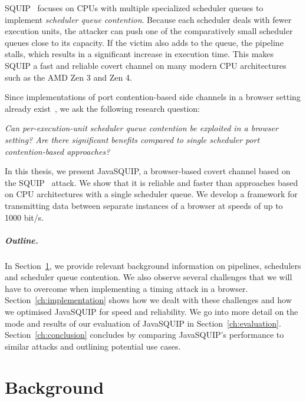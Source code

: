 \documentclass[11pt,
  titlepage=false,
]{scrreprt}
\begin{document}
SQUIP~\cite{squip} focuses on CPUs with multiple specialized scheduler queues to implement \textit{scheduler queue contention}.
Because each scheduler deals with fewer execution units, the attacker can push one of the comparatively small scheduler queues close to its capacity.
If the victim also adds to the queue, the pipeline stalls, which results in a significant increase in execution time.
This makes SQUIP a fast and reliable covert channel on many modern CPU architectures such as the AMD Zen 3 and Zen 4.~\cite{squip}

Since implementations of port contention-based side channels in a browser setting already exist~\cite{Rokicki2022webport}, we ask the following research question:

\textit{
    Can per-execution-unit scheduler queue contention be exploited in a browser setting?
    Are there significant benefits compared to single scheduler port contention-based approaches?
}

In this thesis, we present JavaSQUIP, a browser-based covert channel based on the SQUIP~\cite{squip} attack.
We show that it is reliable and faster than approaches based on CPU architectures with a single scheduler queue.
We develop a framework for transmitting data between separate instances of a browser at speeds of up to 1000 bit/s.

\paragraph{Outline.}
In Section~\ref{ch:background}, we provide relevant background information on pipelines, schedulers and scheduler queue contention.
We also observe several challenges that we will have to overcome when implementing a timing attack in a browser.
Section~\ref{ch:implementation} shows how we dealt with these challenges and how we optimised JavaSQUIP for speed and reliability.
We go into more detail on the mode and results of our evaluation of JavaSQUIP in Section~\ref{ch:evaluation}.
Section~\ref{ch:conclusion} concludes by comparing JavaSQUIP's performance to similar attacks and outlining potential use cases.



\chapter{Background}
\label{ch:background}
\end{document}
